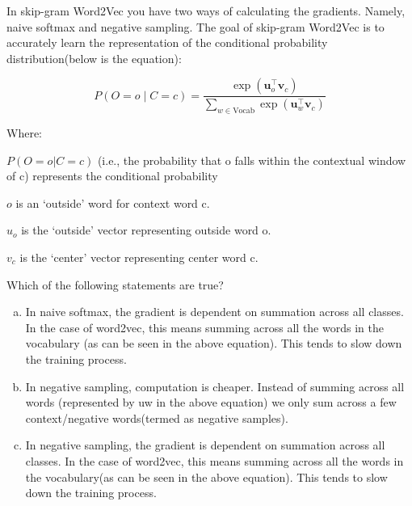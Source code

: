 \begin{enumerate}[1.]
In skip-gram Word2Vec you have two ways of calculating the gradients. Namely, naive softmax and negative sampling. The goal of skip-gram Word2Vec is to accurately learn the representation of the conditional probability distribution(below is the equation):

\begin{equation*}P(O=o \mid C=c) = \frac{\exp(\bm u_{o}^\top \bm v_c)}{\sum_{w \in \text{Vocab}} \exp(\bm u_{w}^\top \bm v_c)}\end{equation*}

Where:

$P(O = o \vert C = c)$ (i.e., the probability that o falls within the contextual window of c) represents the conditional probability

$o$ is an `outside' word for context word c.

$u_o$ is the `outside' vector representing outside word o.

$v_c$ is the `center' vector representing center word c. 

Which of the following statements are true?

\begin{enumerate}[(a)]
\item In naive softmax, the gradient is dependent on summation across all classes. In the case of word2vec, this means summing across all the words in the vocabulary (as can be seen in the above equation). This tends to slow down the training process.
\item In negative sampling, computation is cheaper. Instead of summing across all words (represented by uw in the above equation) we only sum across a few context/negative words(termed as negative samples).
\item In negative sampling, the gradient is dependent on summation across all classes. In the case of word2vec, this means summing across all the words in the vocabulary(as can be seen in the above equation). This tends to slow down the training process.
\end{enumerate}

\end{enumerate}